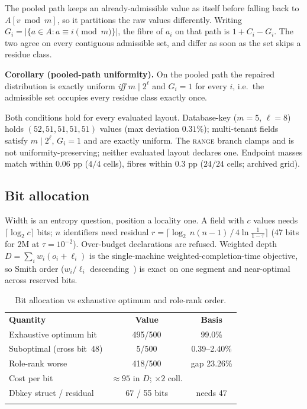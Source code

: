 \documentclass{svproc}
\begin{document}
The pooled path keeps an already-admissible value as itself before falling back to $A[v \bmod m]$, so it partitions the raw values differently. Writing $G_i = |\{a \in A : a \equiv i \pmod m\}|$, the fibre of $a_i$ on that path is $1 + C_i - G_i$. The two agree on every contiguous admissible set, and differ as soon as the set skips a residue class.

\textbf{Corollary (pooled-path uniformity).} On the pooled path the repaired distribution is exactly uniform \emph{iff} $m \mid 2^\ell$ and $G_i = 1$ for every $i$, i.e.\ the admissible set occupies every residue class exactly once.

Both conditions hold for every evaluated layout. Database-key ($m=5$, $\ell=8$) holds $(52,51,51,51,51)$ values (max deviation $0.31\%$); multi-tenant fields satisfy $m \mid 2^\ell$, $G_i=1$ and are exactly uniform. The \textsc{range} branch clamps and is not uniformity-preserving; neither evaluated layout declares one. Endpoint masses match within $0.06$ pp ($4/4$ cells), fibres within $0.3$ pp ($24/24$ cells; archived grid).

\subsection{Bit allocation}
\label{sec:bit-allocation}

Width is an entropy question, position a locality one. A field with $c$ values needs $\lceil \log_2 c \rceil$ bits; $n$ identifiers need residual $r=\lceil \log_2\, n(n-1)\,/\,4\ln\frac{1}{1-\tau} \rceil$ (47 bits for $2$M at $\tau=10^{-2}$). Over-budget declarations are refused. Weighted depth $D=\sum_i w_i(o_i+\ell_i)$ is the single-machine weighted-completion-time objective, so Smith order ($w_i/\ell_i$ descending~\cite{24}) is exact on one segment and near-optimal across reserved bits. \begin{table}[t]
\caption{Bit allocation vs exhaustive optimum and role-rank order.}
\label{tab:bit-allocation}
\centering\scriptsize\setlength{\tabcolsep}{3pt}
\begin{tabular}{lcc}
\hline\noalign{\smallskip}
\textbf{Quantity} & \textbf{Value} & \textbf{Basis} \\
\noalign{\smallskip}\hline\noalign{\smallskip}
Exhaustive optimum hit & 495/500 & 99.0\% \\
Suboptimal (cross bit~48) & 5/500 & 0.39--2.40\% \\
Role-rank worse & 418/500 & gap 23.26\% \\
Cost per bit & $\approx 95$ in $D$; $\times 2$ coll. \\
Dbkey struct / residual & 67 / 55 bits & needs 47 \\
\noalign{\smallskip}\hline
\end{tabular}
\end{table}
\end{document}

